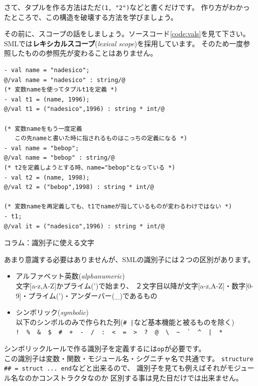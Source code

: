 \documentclass[11pt,a4paper]{article}
\begin{document}
さて、タプルを作る方法はただ\lstinline{(1, "2")}などと書くだけです。
作り方がわかったところで、この構造を破壊する方法を学びましょう。

その前に、スコープの話をしましょう。ソースコード\ref{code:vals}を見て下さい。
SMLでは{\bfseries レキシカルスコープ}({\itshape lexical scope})を採用しています。
そのため一度参照したものの参照先が変わることはありません。

\begin{lstlisting}[caption=valのスコープ,label=code:vals]
- val name = "nadesico";
@/val name = "nadesico" : string/@
(* 変数nameを使ってタプルt1を定義 *)
- val t1 = (name, 1996);
@/val t1 = ("nadesico",1996) : string * int/@

(* 変数nameをもう一度定義
   この先nameと書いた時に指されるものはこっちの定義になる *)
- val name = "bebop";
@/val name = "bebop" : string/@
(* t2を定義しようとする時、name="bebop"となっている *)
- val t2 = (name, 1998);
@/val t2 = ("bebop",1998) : string * int/@

(* 変数nameを再定義しても、t1でnameが指しているものが変わるわけではない *)
- t1;
@/val it = ("nadesico",1996) : string * int/@
\end{lstlisting}

\begin{itembox}[l]{コラム：識別子に使える文字}

あまり意識する必要はありませんが、SMLの識別子には２つの区別があります。

\begin{itemize}
\item アルファベット英数(\textit{alphanumeric}) \\
  文字[a-z,A-Z]かプライム(')で始まり、
  ２文字目以降が文字[a-z,A-Z]・数字[0-9]・プライム(')・アンダーバー(\_)であるもの
\item シンボリック(\textit{symbolic})\\
  以下のシンボルのみで作られた列(\verb(# |(など基本機能と被るものを除く)\\
\Verb(!  %  &  $  #  +  -  /  :  <  =  >  ?  @  \  ~  `  ^  |  *(
\end{itemize}
シンボリックルールで作る識別子を定義するには\lstinline{op}が必要です。\\
この識別子は変数・関数・モジュール名・シグニチャ名で共通です。
\lstinline{structure ## = struct ... end}などと出来るので、
識別子を見ても例えばそれがモジュール名なのかコンストラクタなのか
区別する事は見た目だけでは出来ません。
\end{itembox}
\end{document}
